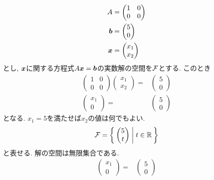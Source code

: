 \begin{example}
  \begin{align*}
    A&=\begin{pmatrix}1&0\\0&0\end{pmatrix}\\
    \boldsymbol{b}&=\begin{pmatrix}5\\0\end{pmatrix}\\
    \boldsymbol{x}&=\begin{pmatrix}x_1\\x_2\end{pmatrix}
  \end{align*}
  とし,
  $\boldsymbol{x}$に関する方程式$A\boldsymbol{x}=\boldsymbol{b}$の実数解の空間を$\mathcal{F}$とする.
  このとき
  \begin{align*}
    \begin{pmatrix}1&0\\0&0\end{pmatrix}
      \begin{pmatrix}x_1\\x_2\end{pmatrix}=&
        \begin{pmatrix}5\\0\end{pmatrix}\\
          \begin{pmatrix}x_1\\0\end{pmatrix}=&
            \begin{pmatrix}5\\0\end{pmatrix}
  \end{align*}
  となる.
  $x_1=5$を満たせば$x_2$の値は何でもよい.
  \begin{align*}
    \mathcal{F}=\Set{\begin{pmatrix}5\\t\end{pmatrix} | t\in \mathbb{R}}
  \end{align*}
  と表せる.
  解の空間は無限集合である.
  \begin{align*}
          \begin{pmatrix}x_1\\0\end{pmatrix}=&
            \begin{pmatrix}5\\0\end{pmatrix}
  \end{align*}

\end{example}
